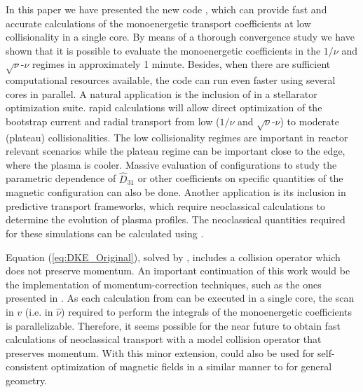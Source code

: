In this paper we have presented the new code {\MONKES}, which can provide fast and accurate calculations of the monoenergetic transport coefficients at low collisionality in a single core. By means of a thorough convergence study we have shown that it is possible to evaluate the monoenergetic coefficients in the $1/\nu$ and $\sqrt{\nu}$-$\nu$ regimes in approximately 1 minute. Besides, when there are sufficient computational resources available, the code can run even faster using several cores in parallel. A natural application is the inclusion of {\MONKES} in a stellarator optimization suite. {\MONKES} rapid calculations will allow direct optimization of the bootstrap current and radial transport from low ($1/\nu$ and $\sqrt{\nu}$-$\nu$) to moderate (plateau) collisionalities. The low collisionality regimes are important in reactor relevant scenarios while the plateau regime can be important close to the edge, where the plasma is cooler.  Massive evaluation of configurations to study the parametric dependence of $\widehat{D}_{31}$ or other coefficients on specific quantities of the magnetic configuration can also be done. Another application is its inclusion in predictive transport frameworks, which require neoclassical calculations to determine the evolution of plasma profiles. The neoclassical quantities required for these simulations can be calculated using {\MONKES}.


Equation (\ref{eq:DKE_Original}), solved by {\MONKES}, includes a collision operator which does not preserve momentum. An important continuation of this work would be the implementation of momentum-correction techniques, such as the ones presented in \cite{Taguchi,Sugama-PENTA,Sugama2008,MaasbergMomentumCorrection}. As each calculation from {\MONKES} can be executed in a single core, the scan in $v$ (i.e. in $\hat{\nu}$) required to perform the integrals of the monoenergetic coefficients is parallelizable. Therefore, it seems possible for the near future to obtain fast calculations of neoclassical transport with a model collision operator that preserves momentum. With this minor extension, {\MONKES} could also be used for self-consistent optimization of magnetic fields in a similar manner to \cite{Landreman_SelfConsistent} for general geometry. 
 

 





